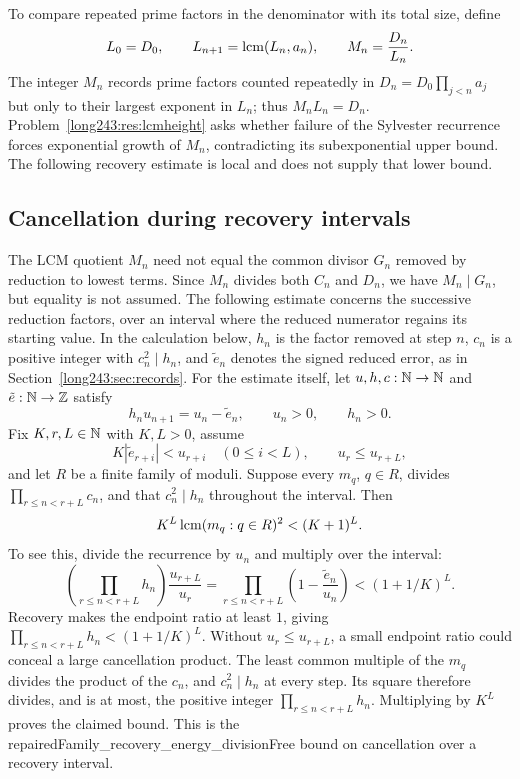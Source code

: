 \documentclass[11pt]{article}
\begin{document}
To compare repeated prime factors in the denominator with its total
size, define
\[
 L_0=D_0,\qquad L_{n+1}=\operatorname{lcm}(L_n,a_n),\qquad M_n=\frac{D_n}{L_n}.
\]
The integer $M_n$ records prime factors counted repeatedly in
$D_n=D_0\prod_{j<n}a_j$ but only to their largest exponent in $L_n$;
thus $M_nL_n=D_n$. Problem~\ref{long243:res:lcmheight} asks whether
failure of the Sylvester recurrence forces exponential growth of $M_n$,
contradicting its subexponential upper bound. The following recovery
estimate is local and does not supply that lower bound.

\subsection{Cancellation during recovery intervals}

The LCM quotient $M_n$ need not equal the common divisor $G_n$ removed
by reduction to lowest terms. Since $M_n$ divides both $C_n$ and $D_n$,
we have $M_n\mid G_n$, but equality is not assumed. The following
estimate concerns the successive reduction factors, over an interval
where the reduced numerator regains its starting value.
In the calculation below, $h_n$ is the factor removed at step $n$,
$c_n$ is a positive integer with $c_n^2\mid h_n$, and $\tilde e_n$
denotes the signed reduced error, as in Section~\ref{long243:sec:records}.
For the estimate itself, let $u,h,c:\mathbb{N}\to\mathbb{N}$ and $\tilde e:\mathbb{N}\to\mathbb{Z}$ satisfy
\[
 h_nu_{n+1}=u_n-\tilde e_n,
 \qquad u_n>0,
 \qquad h_n>0.
\]
Fix $K,r,L\in\mathbb{N}$ with $K,L>0$, assume
\[
 K|\tilde e_{r+i}|<u_{r+i}\quad(0\le i<L),
 \qquad u_r\le u_{r+L},
\]
and let $R$ be a finite family of moduli.  Suppose every $m_q$, $q\in R$,
divides $\prod_{r\le n<r+L}c_n$, and that
$c_n^2\mid h_n$ throughout the interval.  Then
\begin{equation}\label{long243:eq:repair-entropy}
 K^L\lcm(m_q:q\in R)^2<(K+1)^L.
\end{equation}
To see this, divide the recurrence by $u_n$ and multiply over the interval:
\[
 \left(\prod_{r\le n<r+L}h_n\right)\frac{u_{r+L}}{u_r}
 =\prod_{r\le n<r+L}\left(1-\frac{\tilde e_n}{u_n}\right)
 <(1+1/K)^L.
\]
Recovery makes the endpoint ratio at least $1$, giving
$\prod_{r\le n<r+L}h_n<(1+1/K)^L$. Without $u_r\le u_{r+L}$,
a small endpoint ratio could conceal a large cancellation product.
The least common multiple of the $m_q$ divides the product of the
$c_n$, and $c_n^2\mid h_n$ at every step. Its square therefore divides,
and is at most, the positive integer $\prod_{r\le n<r+L}h_n$.
Multiplying by $K^L$ proves the claimed bound.
This is the
      {repairedFamily_recovery_energy_divisionFree}
      {bound on cancellation over a recovery interval}.
\end{document}
